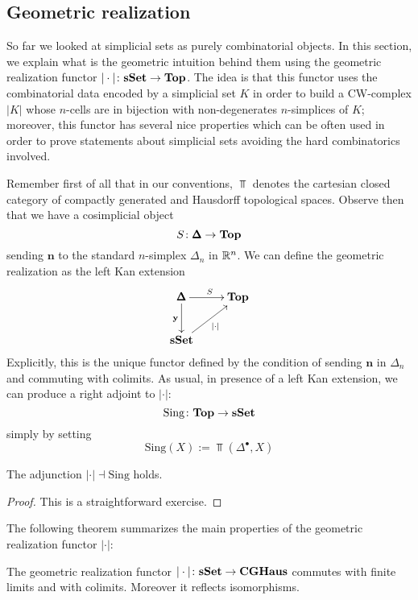 \begin{refsection}
\section{Geometric realization}

So far we looked at simplicial sets as purely combinatorial objects. In this section, we explain what is the geometric intuition behind them using the geometric realization functor $|\cdot| \colon \mathbf{sSet} \to \mathbf{Top}$. The idea is that this functor uses the combinatorial data encoded by a simplicial set $K$ in order to build a CW-complex $|K|$ whose $n$-cells are in bijection with non-degenerates $n$-simplices of $K$; moreover, this functor has several nice properties which can be often used in order to prove statements about simplicial sets avoiding the hard combinatorics involved.

Remember first of all that in our conventions, $\Top$ denotes the cartesian closed category of compactly generated and Hausdorff topological spaces. Observe then that we have a cosimplicial object
\[
S \colon \pmb{\Delta} \to \mathbf{Top}
\]
sending $\mathbf n$ to the standard $n$-simplex $\Delta_n$ in $\mathbb{R}^n$. We can define the geometric realization as the left Kan extension
\[
\xymatrix{
\SDelta \ar[r]^{S} \ar[d]_{\mathbf y} & \Top \\
\sset \ar[ur]_{|\cdot|}
}
\]
Explicitly, this is the unique functor defined by the condition of sending $\mathbf n$ in $\Delta_n$ and commuting with colimits. As usual, in presence of a left Kan extension, we can produce a right adjoint to $|\cdot|$:
\[
\mathrm{Sing} \colon \mathbf{Top} \to \mathbf{sSet}
\]
simply by setting
\[
\mathrm{Sing}(X) := \Top(\Delta^{\bullet}, X)
\]

\begin{lemma}
The adjunction $|\cdot| \dashv \mathrm{Sing}$ holds.
\end{lemma}

\begin{proof}
This is a straightforward exercise.
\end{proof}

The following theorem summarizes the main properties of the geometric realization functor $|\cdot|$:

\begin{thm} \label{thm exactness of geometric realization}
The geometric realization functor $| \cdot | \colon \mathbf{sSet} \to \mathbf{CGHaus}$ commutes with finite limits and with colimits. Moreover it reflects isomorphisms.
\end{thm}


\end{refsection}
